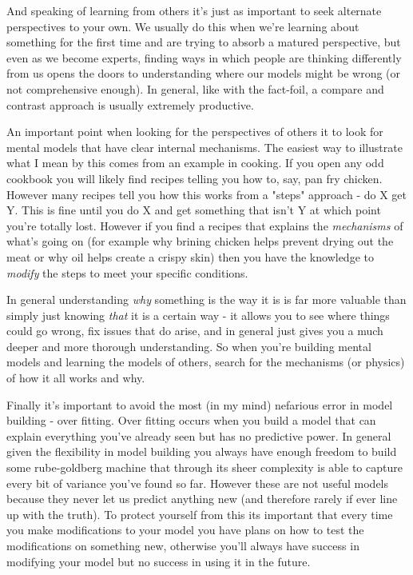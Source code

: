 \documentclass[11pt,a5paper]{book}
\begin{document}
And speaking of learning from others it's just as important to seek alternate perspectives to your own. We usually do this when we're learning about something for the first time and are trying to absorb a matured perspective, but even as we become experts, finding ways in which people are thinking differently from us opens the doors to understanding where our models might be wrong (or not comprehensive enough). In general, like with the fact-foil, a compare and contrast approach is usually extremely productive.
\newline

An important point when looking for the perspectives of others it to look for mental models that have clear internal mechanisms. The easiest way to illustrate what I mean by this comes from an example in cooking. If you open any odd cookbook you will likely find recipes telling you how to, say, pan fry chicken. However many recipes tell you how this works from a "steps" approach - do X get Y. This is fine until you do X and get something that isn't Y at which point you're totally lost. However if you find a recipes that explains the \textit{mechanisms} of what's going on (for example why brining chicken helps prevent drying out the meat or why oil helps create a crispy skin) then you have the knowledge to \textit{modify} the steps to meet your specific conditions. 
\newline

In general understanding \textit{why} something is the way it is is far more valuable than simply just knowing \textit{that} it is a certain way - it allows you to see where things could go wrong, fix issues that do arise, and in general just gives you a much deeper and more thorough understanding. So when you're building mental models and learning the models of others, search for the mechanisms (or physics) of how it all works and why.
\newline

Finally it's important to avoid the most (in my mind) nefarious error in model building - over fitting. Over fitting occurs when you build a model that can explain everything you've already seen but has no predictive power. In general given the flexibility in model building you always have enough freedom to build some rube-goldberg machine that through its sheer complexity is able to capture every bit of variance you've found so far. However these are not useful models because they never let us predict anything new (and therefore rarely if ever line up with the truth). To protect yourself from this its important that every time you make modifications to your model you have plans on how to test the modifications on something new, otherwise you'll always have success in modifying your model but no success in using it in the future. 
\newline
\end{document}

